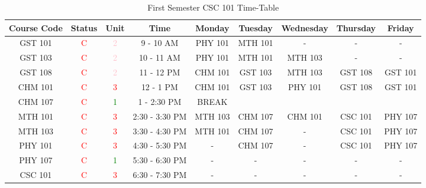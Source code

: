 \documentclass{article}
\begin{document}
	\begin{sidewaystable}[h!]
		\begin{center}
			\caption{First Semester CSC 101 Time-Table}
			\label{tab:table1}
			\vline \begin{tabular}{c|c|c|c|c|c|c|c|c}
				\hline
				\cellcolor{purple!20}\textbf{Course Code} & \cellcolor{purple!20}\textbf{Status} & \cellcolor{purple!20}\textbf{Unit} & \cellcolor{purple!20}\textbf{Time} & \cellcolor{pink!20}\textbf{Monday}& \cellcolor{pink!20}\textbf{Tuesday }& \cellcolor{pink!20}\textbf{Wednesday}& \cellcolor{pink!20}\textbf{Thursday} & \cellcolor{pink!20}\textbf{Friday}\\
				\hline
				\cellcolor{purple!40}GST 101 & \textcolor{red}C & \textcolor{pink}2 & 9 - 10 AM & PHY 101 & MTH 101 & - & - & - \\
				\cellcolor{purple!40}GST 103 & \textcolor{red}C & \textcolor{pink}2 & 10 - 11 AM & PHY 101 & MTH 101 & MTH 103 & - & - \\
				\cellcolor{purple!40}GST 108 & \textcolor{red}C & \textcolor{pink}2 & 11 - 12 PM & CHM 101 & GST 103 & MTH 103 & GST 108 & GST 101 \\
				\cellcolor{purple!40}CHM 101 & \textcolor{red}C & \textcolor{red}3 & 12 - 1 PM & CHM 101 & GST 103 & PHY 101 & GST 108 & GST 101 \\
				\hline
				\cellcolor{purple!40}CHM 107 & \textcolor{red}C & \textcolor{green}1 & 1 - 2:30 PM & \cellcolor{pink!20}BREAK & \cellcolor{pink!20} & \cellcolor{pink!20} & \cellcolor{pink!20} & \cellcolor{pink!20}\\
				\hline
				\cellcolor{purple!40}MTH 101 & \textcolor{red}C & \textcolor{red}3 & 2:30 - 3:30 PM & MTH 103 & CHM 107 & CHM 101 & CSC 101 & PHY 107 \\
				\cellcolor{purple!40}MTH 103 & \textcolor{red}C & \textcolor{red}3 & 3:30 - 4:30 PM & MTH 101 & CHM 107 & - & CSC 101 & PHY 107 \\
				\cellcolor{purple!40}PHY 101 & \textcolor{red}C & \textcolor{red}3 & 4:30 - 5:30 PM & - & CHM 107 & - & CSC 101 & PHY 107 \\
				\cellcolor{purple!40}PHY 107 & \textcolor{red}C & \textcolor{green}1 & 5:30 - 6:30 PM & - & - & - & - & - \\
				\cellcolor{purple!40}CSC 101 & \textcolor{red}C & \textcolor{red}3 & 6:30 - 7:30 PM & - & - & - & - & - \\
				\hline  
			\end{tabular} 
		\end{center}
	\end{sidewaystable}
\end{document}
